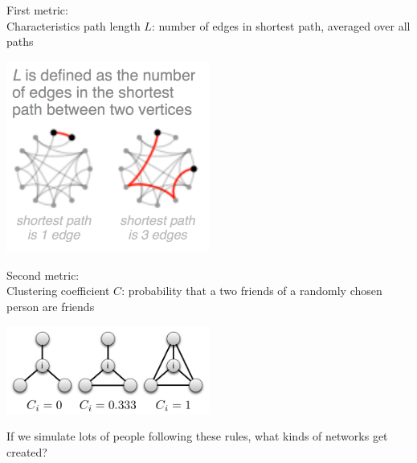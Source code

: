 \documentclass[aspectratio=169]{beamer}
\begin{document}
\begin{frame}

First metric:\\
Characteristics path length $L$: number of edges in shortest path, averaged over all paths\\

\begin{center}
\includegraphics[width = 0.5\textwidth]{figures/victor_2011_L}
\end{center}


\end{frame}
\begin{frame}

Second metric:\\
Clustering coefficient $C$: probability that a two friends of a randomly chosen person are friends\\

\begin{center}
\includegraphics[width = 0.5\textwidth]{figures/local_clustering_coeff}
\end{center}


\end{frame}
\begin{frame}

If we simulate lots of people following these rules, what kinds of networks get created?

\end{frame}
\end{document}

